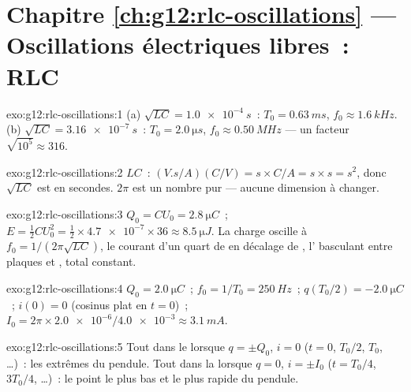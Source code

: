 \section*{Chapitre \ref{ch:g12:rlc-oscillations} --- Oscillations électriques libres~: RLC}

\begin{solution}{exo:g12:rlc-oscillations:1}
(a) $\sqrt{LC} = \qty{1.0e-4}{s}$~: $T_0 = \qty{0.63}{ms}$,
$f_0 \approx \qty{1.6}{kHz}$. (b) $\sqrt{LC} = \qty{3.16e-7}{s}$~:
$T_0 = \qty{2.0}{\micro s}$, $f_0 \approx \qty{0.50}{MHz}$ --- un
facteur $\sqrt{10^5} \approx 316$.
\end{solution}

\begin{solution}{exo:g12:rlc-oscillations:2}
$LC$~: $(\unit{V.s/A})(\unit{C/V}) = \unit{s} \times \unit{C/A} =
\unit{s} \times \unit{s} = \unit{s^2}$, donc $\sqrt{LC}$ est en
secondes. $2\pi$ est un nombre pur --- aucune dimension à changer.
\end{solution}

\begin{solution}{exo:g12:rlc-oscillations:3}
$Q_0 = CU_0 = \qty{2.8}{\micro C}$~; $E = \tfrac12 CU_0^2 =
\tfrac12 \times \num{4.7e-7} \times 36 \approx \qty{8.5}{\micro J}$.
La charge oscille à $f_0 = 1/(2\pi\sqrt{LC})$, le courant d'un quart
de  en décalage de
, l' basculant entre
plaques et , total constant.
\end{solution}

\begin{solution}{exo:g12:rlc-oscillations:4}
$Q_0 = \qty{2.0}{\micro C}$~; $f_0 = 1/T_0 = \qty{250}{Hz}$~;
$q(T_0/2) = \qty{-2.0}{\micro C}$~; $i(0) = 0$ (cosinus plat en
$t=0$)~; $I_0 = 2\pi \times \num{2.0e-6}/\num{4.0e-3} \approx
\qty{3.1}{mA}$.
\end{solution}

\begin{solution}{exo:g12:rlc-oscillations:5}
Tout dans le  lorsque $q = \pm Q_0$,
$i = 0$ ($t = 0$, $T_0/2$, $T_0$, \dots)~: les extrêmes du pendule.
Tout dans la  lorsque $q = 0$, $i = \pm I_0$
($t = T_0/4$, $3T_0/4$, \dots)~: le point le plus bas et le plus
rapide du pendule.
\end{solution}

